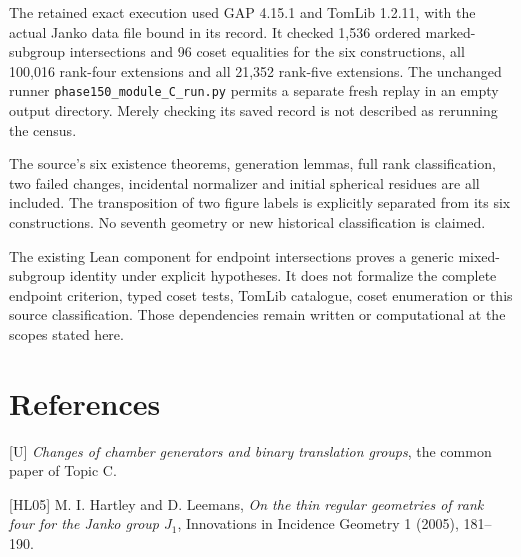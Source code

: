 The retained exact execution used GAP 4.15.1 and TomLib 1.2.11, with
the actual Janko data file bound in its record. It checked 1,536
ordered marked-subgroup intersections and 96 coset equalities for the
six constructions, all 100,016 rank-four extensions and all 21,352
rank-five extensions. The unchanged runner
\texttt{phase150\_module\_C\_run.py} permits a separate fresh replay
in an empty output directory. Merely checking its saved record is not
described as rerunning the census.

The source's six existence theorems, generation lemmas, full rank
classification, two failed changes, incidental normalizer and initial
spherical residues are all included. The transposition of two figure
labels is explicitly separated from its six constructions. No seventh
geometry or new historical classification is claimed.

The existing Lean component for endpoint intersections proves a
generic mixed-subgroup identity under explicit hypotheses. It does
not formalize the complete endpoint criterion, typed coset tests,
TomLib catalogue, coset enumeration or this source classification.
Those dependencies remain written or computational at the scopes
stated here.
\section*{References}
{[}U{]} \emph{Changes of chamber generators and binary translation
groups}, the common paper of Topic C.

{[}HL05{]} M. I. Hartley and D. Leemans,
\emph{On the thin regular geometries of rank four for the Janko group
$J_1$}, Innovations in Incidence Geometry 1 (2005), 181--190.

